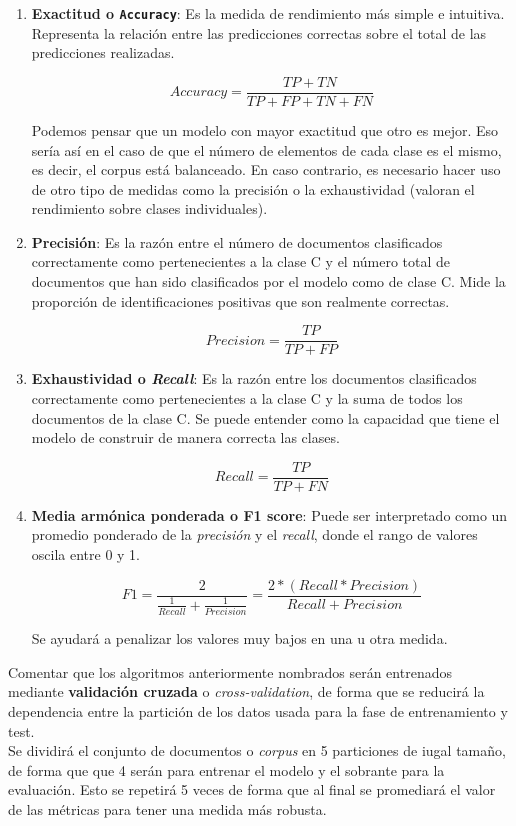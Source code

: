 \documentclass[a4paper,12pt]{report}
\begin{document}
\begin{enumerate}

\item \textbf{Exactitud o \texttt{Accuracy}}: Es la medida de rendimiento más simple e intuitiva. Representa la relación entre las predicciones correctas sobre el total de las predicciones realizadas. 

\[  Accuracy = \frac{TP + TN}{TP + FP + TN + FN} \]

\vspace{4mm}
Podemos pensar que un modelo con mayor exactitud que otro es mejor. Eso sería así en el caso de que el número de elementos de cada clase es el mismo, es decir, el corpus está balanceado. En caso contrario, es necesario hacer uso de otro tipo de medidas como la precisión o la exhaustividad (valoran el rendimiento sobre clases individuales). 

\vspace{4mm}
\item \textbf{Precisión}: Es la razón entre el número de documentos clasificados correctamente como pertenecientes a la clase C y el número total de documentos que han sido clasificados por el modelo como de clase C. Mide la proporción de identificaciones positivas que son realmente correctas.

\[ Precision = \frac{TP}{TP + FP} \]

\vspace{4mm}
\item \textbf{Exhaustividad o \textit{Recall}}: Es la razón entre los documentos clasificados correctamente como pertenecientes a la clase C y la suma de todos los documentos de la clase C. Se puede entender como la capacidad que tiene el modelo de construir de manera correcta las clases.

\[ Recall = \frac{TP}{TP + FN} \]

\vspace{4mm}
\item \textbf{Media armónica ponderada o F1 score}: Puede ser interpretado como un promedio ponderado de la \textit{precisión} y el \textit{recall}, donde el rango de valores oscila entre 0 y 1. 

\[ F1 = \frac{2}{\frac{1}{Recall}+\frac{1}{Precision}} = \frac{2*(Recall*Precision)}{Recall + Precision} \]

Se ayudará a penalizar los valores muy bajos en una u otra medida.
\end{enumerate}

\vspace{4mm}
Comentar que los algoritmos anteriormente nombrados serán entrenados mediante \textbf{validación cruzada} o \textit{cross-validation}, de forma que se reducirá la dependencia entre la partición de los datos usada para la fase de entrenamiento y test. 
\vspace{2mm}\\
Se dividirá el conjunto de documentos o \textit{corpus} en 5 particiones de iugal tamaño, de forma que que 4 serán para entrenar el modelo y el sobrante para la evaluación. Esto se repetirá 5 veces de forma que al final se promediará el valor de las métricas para tener una medida más robusta. 
\end{document}
